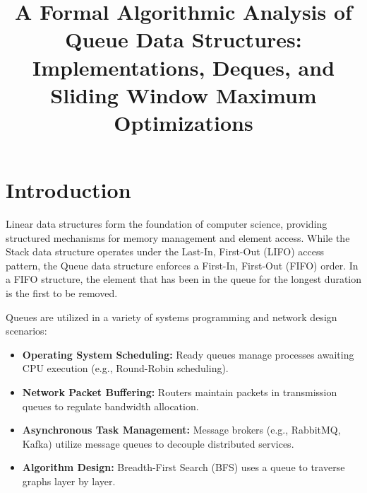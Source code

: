 \documentclass[10pt,journal,compsoc,onecolumn]{IEEEtran}
\begin{document}
\title{A Formal Algorithmic Analysis of Queue Data Structures: Implementations, Deques, and Sliding Window Maximum Optimizations}


\maketitle
\IEEEdisplaynontitleabstractindextext
\IEEEpeerreviewmaketitle

\section{Introduction}
Linear data structures form the foundation of computer science, providing structured mechanisms for memory management and element access. While the Stack data structure operates under the Last-In, First-Out (LIFO) access pattern, the Queue data structure enforces a First-In, First-Out (FIFO) order. In a FIFO structure, the element that has been in the queue for the longest duration is the first to be removed.

Queues are utilized in a variety of systems programming and network design scenarios:
\begin{itemize}
    \item \textbf{Operating System Scheduling:} Ready queues manage processes awaiting CPU execution (e.g., Round-Robin scheduling).
    \item \textbf{Network Packet Buffering:} Routers maintain packets in transmission queues to regulate bandwidth allocation.
    \item \textbf{Asynchronous Task Management:} Message brokers (e.g., RabbitMQ, Kafka) utilize message queues to decouple distributed services.
    \item \textbf{Algorithm Design:} Breadth-First Search (BFS) uses a queue to traverse graphs layer by layer.
\end{itemize}
\end{document}
